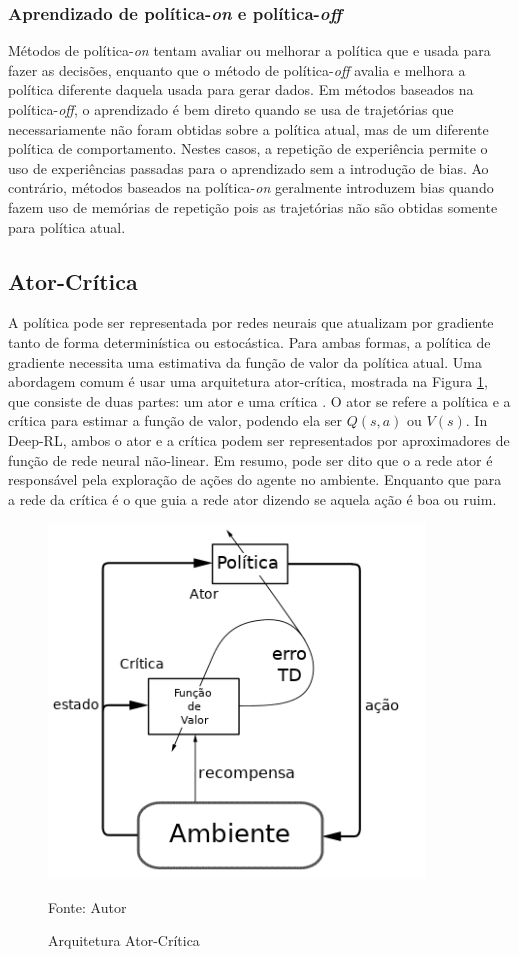 \subsubsection{Aprendizado de política-\textit{on} e política-\textit{off}}

Métodos de política-\textit{on} tentam avaliar ou melhorar a política que e usada para fazer as decisões, enquanto que o método de política-\textit{off} avalia e melhora a política diferente daquela usada para gerar dados. Em métodos baseados na política-\textit{off}, o aprendizado é bem direto quando se usa de trajetórias que necessariamente não foram obtidas sobre a política atual, mas de um diferente política de comportamento.
Nestes casos, a repetição de experiência permite o uso de experiências passadas para o aprendizado sem a introdução de bias. Ao contrário, métodos baseados na política-\textit{on} geralmente introduzem bias quando fazem uso de memórias de repetição pois as trajetórias não são obtidas somente para política atual.




\subsection{Ator-Crítica}

A política pode ser representada por redes neurais que atualizam por gradiente tanto de forma determinística ou estocástica. Para ambas formas, a política de gradiente necessita uma estimativa da função de valor da política atual. 
Uma abordagem comum é usar uma arquitetura ator-crítica, mostrada na Figura \ref{fig:actor_critic}, que consiste de duas partes: um ator e uma crítica \cite{konda2000actor}.
O ator se refere a política e a crítica para estimar a função de valor, podendo ela ser $Q(s,a)$ ou $V(s)$.
In Deep-RL, ambos o ator e a crítica podem  ser representados por aproximadores de função de rede neural não-linear.
Em resumo, pode ser dito que o a rede ator é responsável pela exploração de ações do agente no ambiente. Enquanto que para a rede da crítica é o que guia a rede ator dizendo se aquela ação é boa ou ruim. 

\vspace{0.25cm}
\begin{figure}[H]
\caption{Arquitetura Ator-Crítica}
\centerline{\includegraphics[width=10cm]{imagens/actor-critic_portuguese.png}}
\small{Fonte: Autor}
\label{fig:actor_critic}
\end{figure}